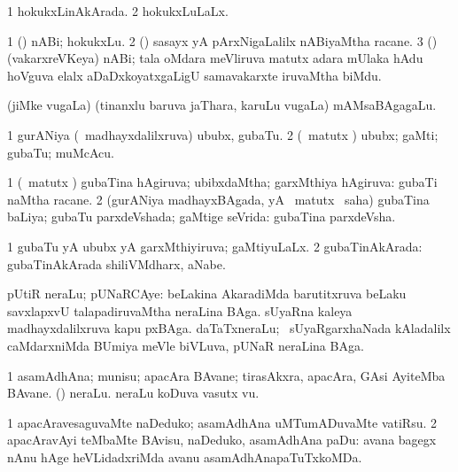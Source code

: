 \bentry
{} 
\gl{\gu}
\expl{}
\bmng
\bnum
\num{1} hokukxLinAkArada. 
\num{2} hokukxLuLaLx. 
\enum
\emng
\eentry

\bentry
{} 
\gl{\nA}
\bmng
\bnum
\num{1} (\aMrashA) nABi; hokukxLu. 
\num{2} (\jiVvi) sasayx yA pArxNigaLalilx nABiyaMtha racane. 
\num{3} (\jAyx) (vakarxreVKeya) nABi; tala oMdara meVliruva matutx adara mUlaka hAdu hoVguva elalx aDaDxkoyatxgaLigU samavakarxte iruvaMtha biMdu. 
\enum
\emng
\eentry

\bentry
{} 
\gl{\nA}
\expl{}
\bmng
(jiMke \mo vugaLa) (tinanxlu baruva jaThara, karuLu \mo vugaLa) mAMsaBAgagaLu. 
\emng
\eentry

\bentry
{} 
\gl{\nA}
\bmng
\bnum
\num{1} gurANiya (\kanmu\ madhayxdalilxruva) ububx, gubaTu. 
\num{2} (\savi\ matutx \pArxvi) ububx; gaMti; gubaTu; muMcAcu. 
\enum
\emng
\eentry

\bentry
{} 
\gl{\gu}
\expl{}
\bmng
\bnum
\num{1} (\savi\ matutx \pArxvi) gubaTina hAgiruva; ubibxdaMtha; garxMthiya hAgiruva:  gubaTi naMtha racane. 
\num{2} (gurANiya madhayxBAgada, yA \savi\ matutx \pArxvi\ saha) gubaTina baLiya; gubaTu parxdeVshada; gaMtige seVrida:  gubaTina parxdeVsha. 
\enum
\emng
\eentry

\bentry
{} 
\gl{\gu}
\expl{}
\bmng
\bnum
\num{1} gubaTu yA ububx yA garxMthiyiruva; gaMtiyuLaLx. 
\num{2} gubaTinAkArada:  gubaTinAkArada shiliVMdharx, aNabe. 
\enum
\emng
\eentry

\bentry
{} 
\gl{\nA}
\expl{}
\bmng
pUtiR neraLu; pUNaRCAye: 
\banum
{} beLakina AkaradiMda barutitxruva beLaku savxlapxvU talapadiruvaMtha neraLina BAga. 
 sUyaRna kaleya madhayxdalilxruva kapu pxBAga. 
 daTaTxneraLu; \sA\ sUyaRgarxhaNada kAladalilx caMdarxniMda BUmiya meVle biVLuva, pUNaR neraLina BAga. 
\eanum
\emng
\eentry

\bentry
{} 
\gl{\nA}
\bmng
\bnum
\num{1} asamAdhAna; munisu; apacAra BAvane; tirasAkxra, apacAra, GAsi AyiteMba BAvane. 
 (\pArxparx) 
\banum
{} neraLu. 
 neraLu koDuva vasutx \mo vu. 
\eanum
\numie
\enum
\emng

\noindent 
\gl{\pagu}
\expl{}
\bmng
\bnum
\num{1}  apacAravesaguvaMte naDeduko; asamAdhAna uMTumADuvaMte vatiRsu. 
\num{2}  apacAravAyi teMbaMte BAvisu, naDeduko, asamAdhAna paDu:  avana bagegx nAnu hAge heVLidadxriMda avanu asamAdhAnapaTuTxkoMDa. 
\enum
\emng
\eentry

